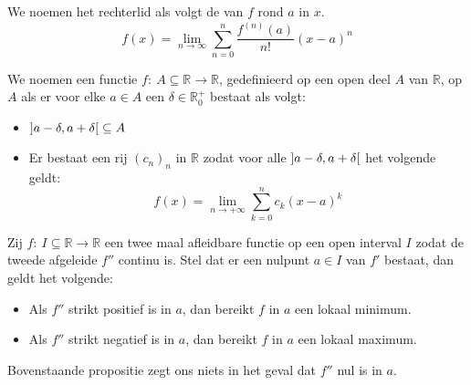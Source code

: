 \documentclass[main.tex]{subfiles}
\begin{document}
\begin{de}
  We noemen het rechterlid als volgt de  van $f$ rond $a$ in $x$.
  \[
  f(x) = \lim_{n \rightarrow \infty}\sum_{n = 0}^{n}\frac{f^{(n)}(a)}{n!}(x-a)^{n} 
  \]
\end{de}


\begin{de}
  We noemen een functie $f:\ A \subseteq \mathbb{R} \rightarrow \mathbb{R}$, gedefinieerd op een open deel $A$ van $\mathbb{R}$,  op $A$ als er voor elke $a\in A$ een $\delta \in \mathbb{R}_{0}^{+}$ bestaat als volgt:
  \begin{itemize}
  \item $\interval[open]{a-\delta}{a+\delta} \subseteq A$
  \item Er bestaat een rij $(c_{n})_{n}$ in $\mathbb{R}$ zodat voor alle $\interval[open]{a-\delta}{a+\delta}$ het volgende geldt:
    \[ f(x) = \lim_{n\rightarrow +\infty}\sum_{k=0}^{n}c_{k}(x-a)^{k} \]
  \end{itemize}
\end{de}

\begin{bpr}
  Zij $f:\ I \subseteq \mathbb{R} \rightarrow \mathbb{R}$ een twee maal afleidbare functie op een open interval $I$ zodat de tweede afgeleide $f''$ continu is.
  Stel dat er een nulpunt $a\in I$ van $f'$ bestaat, dan geldt het volgende:
  \begin{itemize}
  \item Als $f''$ strikt positief is in $a$, dan bereikt $f$ in $a$ een lokaal minimum.
  \item Als $f''$ strikt negatief is in $a$, dan bereikt $f$ in $a$ een lokaal maximum.
  \end{itemize}
\end{bpr}

\begin{opm}
  Bovenstaande propositie zegt ons niets in het geval dat $f''$ nul is in $a$.
\end{opm}
\end{document}
